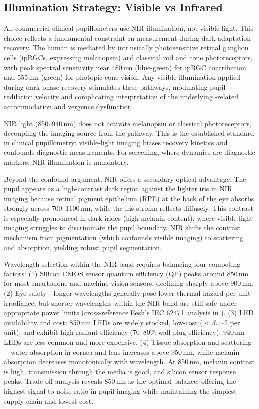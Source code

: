 \subsection{Illumination Strategy: Visible vs Infrared}
\label{sec:hw-illumination-strategy}

All commercial clinical pupillometers use NIR illumination, not visible light. This choice reflects a fundamental constraint on  measurement during dark adaptation recovery. The human  is mediated by intrinsically photosensitive retinal ganglion cells (ipRGCs, expressing melanopsin) and classical rod and cone photoreceptors, with peak spectral sensitivity near 480\,nm (blue-green) for ipRGC contribution and 555\,nm (green) for photopic cone vision. Any visible illumination applied during dark-phase recovery stimulates these pathways, modulating pupil redilation velocity and complicating interpretation of the underlying -related accommodation and vergence dysfunction.

NIR light (850--940\,nm) does not activate melanopsin or classical photoreceptors, decoupling the imaging source from the  pathway. This is the established standard in clinical pupillometry: visible-light imaging biases recovery kinetics and confounds diagnostic measurements. For  screening, where  dynamics are diagnostic markers, NIR illumination is mandatory.

Beyond the confound argument, NIR offers a secondary optical advantage. The pupil appears as a high-contrast dark region against the lighter iris in NIR imaging because retinal pigment epithelium (RPE) at the back of the eye absorbs strongly across 700--1100\,nm, while the iris stroma reflects diffusely. This contrast is especially pronounced in dark irides (high melanin content), where visible-light imaging struggles to discriminate the pupil boundary. NIR shifts the contrast mechanism from pigmentation (which confounds visible imaging) to scattering and absorption, yielding robust pupil segmentation.

Wavelength selection within the NIR band requires balancing four competing factors: (1) Silicon CMOS sensor quantum efficiency (QE) peaks around 850\,nm for most smartphone and machine-vision sensors, declining sharply above 900\,nm. (2) Eye safety---longer wavelengths generally pose lower thermal hazard per unit irradiance, but shorter wavelengths within the NIR band are still safe under appropriate power limits (cross-reference Eesh's IEC 62471 analysis in ). (3) LED availability and cost: 850\,nm LEDs are widely stocked, low-cost ($<\pounds 1$--$2$ per unit), and exhibit high radiant efficiency (70--80\% wall-plug efficiency). 940\,nm LEDs are less common and more expensive. (4) Tissue absorption and scattering---water absorption in cornea and lens increases above 950\,nm, while melanin absorption decreases monotonically with wavelength. At 850\,nm, melanin contrast is high, transmission through the media is good, and silicon sensor response peaks. Trade-off analysis reveals 850\,nm as the optimal balance, offering the highest signal-to-noise ratio in pupil imaging while maintaining the simplest supply chain and lowest cost.

